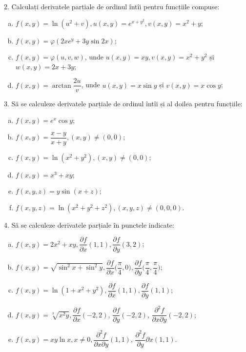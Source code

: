 \vspace{1cm}

2. Calculați derivatele parțiale de ordinul întîi pentru funcțiile compuse:
\begin{enumerate}[(a)]
\item $ f(x, y) = \ln(u^2 + v), u(x, y) = e^{x + y^2}, v(x, y) = x^2 + y $;
\item $ f(x, y) = \varphi(2xe^y + 3y \sin 2x) $;
\item $ f(x, y) = \varphi(u, v, w) $, unde $ u(x, y) = xy, v(x, y) = x^2 + y^2 $ și
  $ w(x, y) = 2x + 3y $;
\item $ f(x, y) = \arctan \dfrac{2u}{v} $, unde $ u(x, y) = x\sin y $ și
  $ v(x, y) = x \cos y $;
\end{enumerate}

\vspace{1cm}

3. Să se calculeze derivatele parțiale de ordinul întîi și al doilea
pentru funcțiile:
\begin{enumerate}[(a)]
\item $ f(x, y) = e^x \cos y $;
\item $ f(x, y) = \dfrac{x - y}{x + y}, (x, y) \neq (0, 0) $;
\item $ f(x, y) = \ln(x^2 + y^2), (x, y) \neq (0, 0) $;
\item $ f(x, y) = x^3 + xy $;
\item $ f(x, y, z) = y \sin (x + z) $;
\item $ f(x, y, z) = \ln(x^2 + y^2 + z^2), (x, y, z) \neq (0, 0, 0) $.
\end{enumerate}

\vspace{1cm}

4. Să se calculeze derivatele parțiale în punctele indicate:
\begin{enumerate}[(a)]
\item $ f(x, y) = 2x^2 + xy, \dfrac{\partial f}{\partial x}(1, 1), %
  \dfrac{\partial f}{\partial y} (3, 2) $;
\item $ f(x, y) = \sqrt{\sin^2 x + \sin^2 y}, \dfrac{\partial f}{\partial x} %
  \Big( \dfrac{\pi}{4}, 0 \Big), \dfrac{\partial f}{\partial y} %
  \Big( \dfrac{\pi}{4}, \dfrac{\pi}{4} \Big) $;
\item $ f(x, y) = \ln(1 + x^2 + y^2), \dfrac{\partial f}{\partial x}(1, 1), %
  \dfrac{\partial f}{\partial y}(1, 1) $;
\item $ f(x, y) = \sqrt[3]{x^2 y}, \dfrac{\partial f}{\partial x}(-2, 2) $,
  $ \dfrac{\partial f}{\partial y}(-2, 2) $, $\dfrac{\partial^2 f}{\partial x\partial y}(-2, 2) $;
\item $ f(x, y) = xy\ln x, x \neq 0, \dfrac{\partial^2 f}{\partial x\partial y}(1, 1) $,
  $ \dfrac{\partial^2 f}{\partial y}{\partial x}(1, 1) $.
\end{enumerate}

